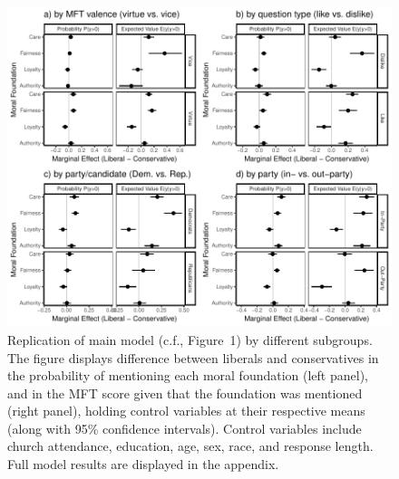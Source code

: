 \documentclass[12pt]{article}
\begin{document}
\begin{figure}[ht]\centering
\includegraphics{../calc/fig/tobit_ideol_app.pdf}
\caption{Replication of main model (c.f., Figure~1) by different subgroups. The figure displays difference between liberals and conservatives in the probability of mentioning each moral foundation (left panel), and in the MFT score given that the foundation was mentioned (right panel), holding control variables at their respective means (along with 95\% confidence intervals). Control variables include church attendance, education, age, sex, race, and response length. Full model results are displayed in the appendix.
}\label{fig:tobit_ideol_app}
\end{figure}
\end{document}
